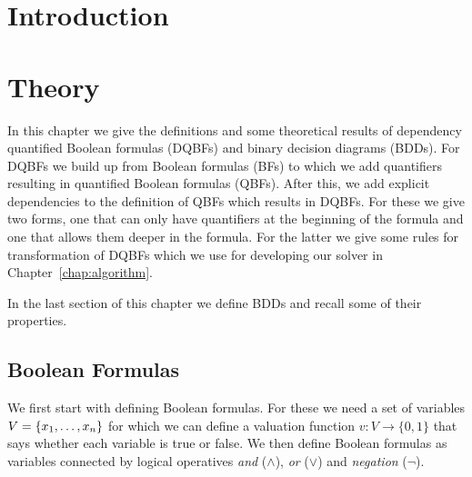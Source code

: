 \documentclass[
  digital, %
  twoside, %
  table,   %
  nolof,     %
  nolot,     %
]{fithesis3}
\let\setbuilder\set
\newcommand{\simpleset}[1]{\{{#1}\}}
\renewcommand{\set}[1]{\normalexpandarg\IfSubStr{#1}{|}{\setbuilder{#1}}{\simpleset{#1}}}
\theoremstyle{definition}
\theoremstyle{remark}
\begin{document}
\chapter{Introduction}

\chapter{Theory}
In this chapter we give the definitions and some theoretical results of dependency quantified Boolean formulas (DQBFs) and binary decision diagrams (BDDs). For DQBFs we build up from Boolean formulas (BFs) to which we add quantifiers resulting in quantified Boolean formulas (QBFs). After this, we add explicit dependencies to the definition of QBFs which results in DQBFs. For these we give two forms, one that can only have quantifiers at the beginning of the formula and one that allows them deeper in the formula. For the latter we give some rules for transformation of DQBFs which we use for developing our solver in Chapter~\ref{chap:algorithm}. 

In the last section of this chapter we define BDDs and recall some of their properties.%


\section{Boolean Formulas}

We first start with defining Boolean formulas. For these we need a set of variables $V = \set{x_1, \dots, x_n}$ for which we can define a valuation function $v\colon V \to \{0,1\}$ that says whether each variable is true or false. We then define Boolean formulas as variables connected by logical operatives \emph{and} (${\land}$), \emph{or} (${\lor}$) and \emph{negation} (${\neg}$).
\end{document}
